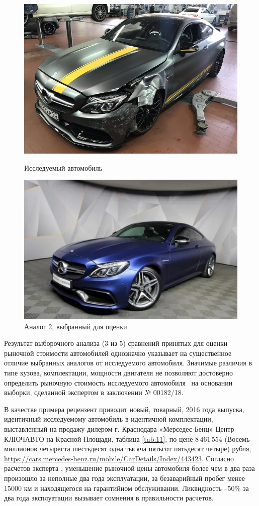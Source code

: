     \begin{figure}[h!]\centering
  	\parbox[t]{0.49\textwidth}
  	{\centering
  		\includegraphics[width=.49\textwidth]{images/i}
  		\caption{\footnotesize {Исследуемый автомобиль}}
  		\label{}}
  	\hfil \hfil%
  	\parbox[t]{0.49\textwidth}
  	{\centering
  		\includegraphics[width=.49\textwidth]{images/an3}
  		\caption{\footnotesize {Аналог 2, выбранный для оценки}}
  		\label{ris:images/an3}}
  \end{figure}


\par Результат выборочного анализа (3 из 5) сравнений принятых для оценки рыночной стоимости автомобилей однозначно указывает на существенное отличие выбранных аналогов от исследуемого автомобиля. Значимые различия в типе кузова, комплектации, мощности двигателя не позволяют достоверно определить рыночную стоимость исследуемого автомобиля  \, на основании выборки, сделанной экспертом в заключении № 00182/18.

  
  В качестве примера рецензент приводит новый, товарный, 2016 года выпуска, идентичный исследуемому автомобиль в идентичной комплектации, выставленный на продажу дилером г.  Краснодара 	«Мерседес-Бенц» Центр КЛЮЧАВТО на Красной Площади,  таблица \ref{tab:11}, по цене 8\,461\,554 (Восемь миллионов четыреста шестьдесят одна тысяча пятьсот пятьдесят четыре) рубля, \url {https://cars.mercedes-benz.ru/mobile/CarDetails/Index/443423}. Согласно расчетов эксперта , уменьшение рыночной цены автомобиля   более чем в два раза произошло за неполные два года эксплуатации, за безаварийный пробег менее 15000 км и находящегося на гарантийном обслуживании. Ликвидность   --50\% за два года эксплуатации вызывает сомнения в правильности расчетов. 
  
